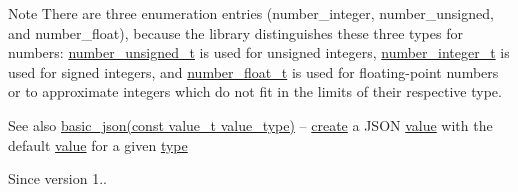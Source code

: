\begin{DoxyNote}{Note}
There are three enumeration entries (number\+\_\+integer, number\+\_\+unsigned, and number\+\_\+float), because the library distinguishes these three types for numbers\+: \hyperlink{classnlohmann_1_1basic__json_a60a04166c122072ab11eaf9845d9cd1d}{number\+\_\+unsigned\+\_\+t} is used for unsigned integers, \hyperlink{classnlohmann_1_1basic__json_ac4b10b2364f26ce47bdb9a413ff04a59}{number\+\_\+integer\+\_\+t} is used for signed integers, and \hyperlink{classnlohmann_1_1basic__json_a74a0013e847fdc574b48f931f0e757e1}{number\+\_\+float\+\_\+t} is used for floating-\/point numbers or to approximate integers which do not fit in the limits of their respective type.
\end{DoxyNote}
\begin{DoxySeeAlso}{See also}
\hyperlink{classnlohmann_1_1basic__json_a8f77085bd98c97a983d9ba12efbf6148}{basic\+\_\+json(const value\+\_\+t value\+\_\+type)} -- \hyperlink{classnlohmann_1_1basic__json_a27df4303fbc83071275074486b54a40e}{create} a J\+S\+O\+N \hyperlink{classnlohmann_1_1basic__json_a0a2cbbd95862a623e7dc5c37e67dead0}{value} with the default \hyperlink{classnlohmann_1_1basic__json_a0a2cbbd95862a623e7dc5c37e67dead0}{value} for a given \hyperlink{classnlohmann_1_1basic__json_a848cbae3bd3502ffbf738320bf5eb3aa}{type}
\end{DoxySeeAlso}
\begin{DoxySince}{Since}
version 1.. 
\end{DoxySince}
